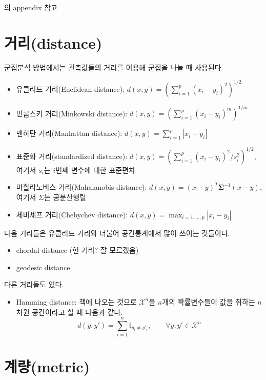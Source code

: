 \documentclass[b5paper,]{scrbook}
\providecommand{\tightlist}{%
  \setlength{\itemsep}{0pt}\setlength{\parskip}{0pt}}
\theoremstyle{plain}
\theoremstyle{definition}
\numberwithin{equation}{section}
\begin{document}
\citep{Beran2013}의 appendix 참고

\section{거리(distance)}\label{distance}

군집분석 방법에서는 관측값들의 거리를 이용해 군집을 나눌 때 사용된다.

\begin{itemize}
\item
  유클리드 거리(Euclidean distance):
  \(d(x,y)=(\sum_{i=1}^{p}(x_{i}-y_{i})^{2})^{1/2}\)
\item
  민콥스키 거리(Minkowski distance):
  \(d(x,y)=(\sum_{i=1}^{p}(x_{i}-y_{i})^{m})^{1/m}\)
\item
  맨하탄 거리(Manhattan distance):
  \(d(x,y)=\sum_{i=1}^{p}|x_{i}-y_{i}|\)
\item
  표준화 거리(standardized distance):
  \(d(x,y)=(\sum_{i=1}^{p}(x_{i}-y_{i})^{2}/s_{i}^{2})^{1/2}\), 여기서
  \(s_{i}\)는 \(i\)번째 변수에 대한 표준편차
\item
  마할라노비스 거리(Mahalanobis distance):
  \(d(x,y)=(x-y)^{T}\boldsymbol{\Sigma}^{-1}(x-y)\), 여기서 \(\Sigma\)는
  공분산행렬
\item
  체비셰프 거리(Chebychev distance):
  \(d(x,y)=\max_{i=1,\ldots ,p}|x_{i}-y_{i}|\)
\end{itemize}

다음 거리들은 유클리드 거리와 더불어 공간통계에서 많이 쓰이는 것들이다.

\begin{itemize}
\item
  chordal distance (현 거리? 잘 모르겠음)
\item
  geodesic distance
\end{itemize}

다른 거리들도 있다.

\begin{itemize}
\tightlist
\item
  Hamming distance: \citep{Massart2007} 책에 나오는 것으로
  \(\mathcal{X}^{n}\)을 \(n\)개의 확률변수들이 값을 취하는 \(n\)차원
  공간이라고 할 때 다음과 같다.
  \[d(y,y')=\sum_{i=1}^{n}\mathbb{I}_{y_{i}\neq y'_{i}}, \qquad{\forall y,y'\in\mathcal{X}^{n}}\]
\end{itemize}

\section{계량(metric)}\label{metric}
\end{document}
